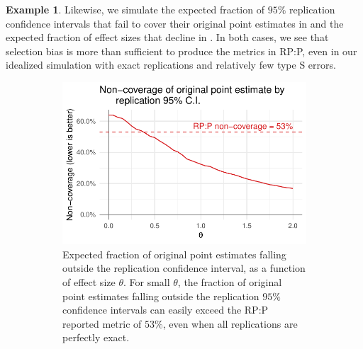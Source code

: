 \documentclass[aoas, preprint]{imsart}
\theoremstyle{definition}
\newtheorem{example}{Example}
\theoremstyle{custom}
\begin{document}
\begin{example}
    Likewise, we simulate the expected fraction of $95\%$ replication confidence intervals that fail to cover their original point estimates in  and the expected fraction of effect sizes that decline in . In both cases, we see that selection bias is more than sufficient to produce the metrics in RP:P, even in our idealized simulation with exact replications and relatively few type S errors.
    \begin{figure}[htbp]
	    \centering
	    \begin{subfigure}[t]{0.59\hsize}
	      \centering
	      \includegraphics[width=\hsize]{naive-ci-sim}
	      \caption{Expected fraction of original point estimates falling outside the replication confidence interval, as a function of effect size $\theta$. For small $\theta$, the fraction of original point estimates falling outside the replication $95\%$ confidence intervals can easily exceed the RP:P reported metric of $53\%$, even when all replications are perfectly exact.}
	    \label{fig:naive-ci-sim-func}
	    \end{subfigure}
	    \hfill
	    \begin{subfigure}[t]{0.39\hsize}
	      \centering

\end{subfigure}
\end{figure}
\end{example}
\end{document}
